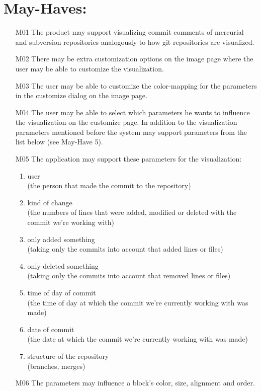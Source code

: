 \documentclass[12pt]{scrartcl}
\begin{document}
\section{May-Haves:}
\begin{enumerate}
\item [M01] The product may support visualizing commit comments of mercurial and
	subversion repositories analogously to how git repositories are
	visualized.
\item [M02] There may be extra customization options on the image page where the user may be able to customize the visualization.
\item [M03] The user may be able to customize the color-mapping for the parameters in the customize dialog on the image page.
\item [M04] The user may be able to select which parameters he wants to influence the visualization on the customize page. In addition to the visualization parameters mentioned before the system may support parameters from the list below (see May-Have 5).
\item [M05] The application may support these parameters for the visualization:
\begin{enumerate}
\item user\\
(the person that made the commit to the repository)
\item kind of change\\  
(the numbers of lines that were added, modified or deleted with the commit we're working with)
\item only added something \\
(taking only the commits into account that added lines or files)
\item only deleted something\\
(taking only the commits into account that removed lines or files)
\item time of day of commit\\
(the time of day at which the commit we're currently working with was made)
\item date of commit\\
(the date at which the commit we're currently working with was made)
\item structure of the repository\\
(branches, merges)
\end{enumerate}
\item [M06] The parameters may influence a block's color, size, alignment and order.

\end{enumerate}
\end{document}
